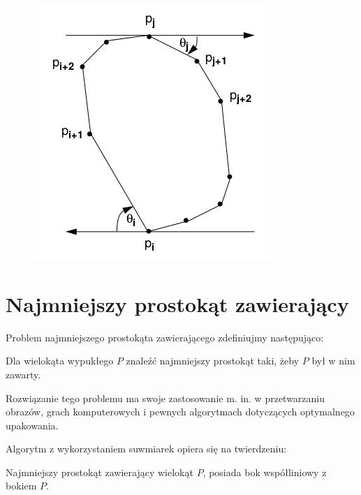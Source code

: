 \begin{figure}[htb]
  \centering
  \includegraphics[scale=0.5]{img/calipers1}
  \caption{\label{img:calipers1}}
\end{figure}


\section{Najmniejszy prostokąt zawierający}
Problem najmniejszego prostokąta zawierającego zdefiniujmy
następująco:

\begin{problem}
  Dla wielokąta wypukłego $P$ znaleźć najmniejszy prostokąt taki, żeby
  $P$ był w nim zawarty.
\end{problem}

Rozwiązanie tego problemu ma swoje zastosowanie m. in. w przetwarzaniu
obrazów, grach komputerowych i pewnych algorytmach dotyczących
optymalnego upakowania.

Algorytm z wykorzystaniem suwmiarek opiera się na twierdzeniu:

\begin{twierdzenie}
  Najmniejszy prostokąt zawierający wielokąt $P$, posiada bok
  współliniowy z bokiem $P$.
\end{twierdzenie}

